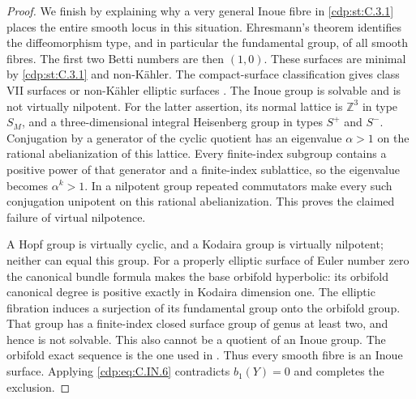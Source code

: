 \begin{proof}
We finish by explaining why a very general Inoue fibre in \ref{cdp:st:C.3.1}
places the entire smooth locus in this situation. Ehresmann's
theorem identifies the diffeomorphism type, and in particular
the fundamental group, of all smooth fibres. The first two
Betti numbers are then $(1,0)$. These surfaces are minimal by
\ref{cdp:st:C.3.1} and non-K\"ahler. The compact-surface classification
gives class VII surfaces or non-K\"ahler elliptic surfaces
\cite[Theorem 3.2]{BMS2012}.
The Inoue group is solvable and is not virtually nilpotent.
For the latter assertion, its normal lattice is $\mathbb Z^3$
in type $S_M$, and a three-dimensional integral Heisenberg group
in types $S^{+}$ and $S^{-}$. Conjugation by a generator of the
cyclic quotient has an eigenvalue $\alpha>1$ on the rational
abelianization of this lattice. Every finite-index subgroup
contains a positive power of that generator and a finite-index
sublattice, so the eigenvalue becomes $\alpha^k>1$. In a
nilpotent group repeated commutators make every such conjugation
unipotent on this rational abelianization. This proves the
claimed failure of virtual nilpotence.

A Hopf group is virtually cyclic, and a Kodaira group is virtually
nilpotent; neither can equal this group. For a properly elliptic
surface of Euler number zero the canonical bundle formula makes
the base orbifold hyperbolic: its orbifold canonical degree is
positive exactly in Kodaira dimension one. The elliptic
fibration induces a surjection of its fundamental group onto the
orbifold group. That group has a finite-index closed surface
group of genus at least two, and hence is not solvable. This
also cannot be a quotient of an Inoue group. The orbifold exact
sequence is the one used in \cite[Section 3.3]{BMS2012}.
Thus every smooth fibre is an Inoue surface. Applying \eqref{cdp:eq:C.IN.6}
contradicts $b_1(Y)=0$ and completes the exclusion.
\end{proof}


